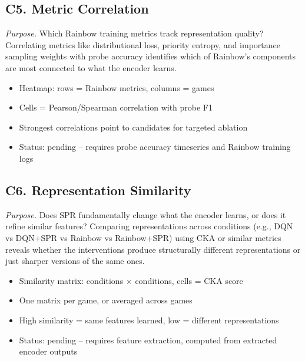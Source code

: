 \documentclass[11pt]{article}
\begin{document}
\vspace{0.5em}

\subsection*{C5. Metric Correlation}

\noindent\textit{Purpose.} Which Rainbow training metrics track
representation quality? Correlating metrics like distributional
loss, priority entropy, and importance sampling weights with
probe accuracy identifies which of Rainbow's components are
most connected to what the encoder learns.

\begin{itemize}[leftmargin=2em, itemsep=0.1em, topsep=0.3em]
  \item Heatmap: rows = Rainbow metrics, columns = games
  \item Cells = Pearson/Spearman correlation with probe F1
  \item Strongest correlations point to candidates for targeted
    ablation
  \item Status: pending -- requires probe accuracy timeseries
    and Rainbow training logs
\end{itemize}

\vspace{0.5em}

\subsection*{C6. Representation Similarity}

\noindent\textit{Purpose.} Does SPR fundamentally change what the
encoder learns, or does it refine similar features? Comparing
representations across conditions (e.g., DQN vs DQN+SPR vs
Rainbow vs Rainbow+SPR) using CKA or similar metrics reveals
whether the interventions produce structurally different
representations or just sharper versions of the same ones.

\begin{itemize}[leftmargin=2em, itemsep=0.1em, topsep=0.3em]
  \item Similarity matrix: conditions $\times$ conditions,
    cells = CKA score
  \item One matrix per game, or averaged across games
  \item High similarity = same features learned, low = different
    representations
  \item Status: pending -- requires feature extraction, computed
    from extracted encoder outputs
\end{itemize}
\end{document}
